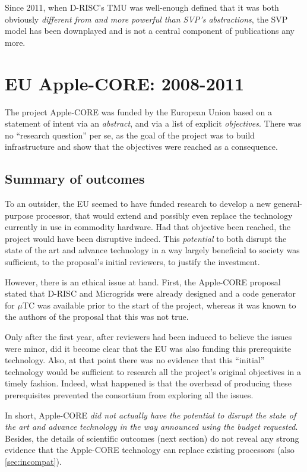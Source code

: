 Since 2011, when D-RISC's TMU was well-enough defined that it was
both obviously \emph{different from and more powerful than SVP's abstractions},
the SVP model has been downplayed and is not a central component of
publications any more.

\section{EU Apple-CORE: 2008-2011}

The project Apple-CORE was funded by the European Union based on a
statement of intent via an \emph{abstract}, and via a list of explicit 
\emph{objectives}. There was no ``research question'' per se, as
the goal of the project was to build infrastructure and show
that the objectives were reached as a consequence.

\subsection{Summary of outcomes}

To an outsider, 
the EU seemed to have funded research to develop a new general-purpose processor,
that would extend and possibly even replace the technology currently
in use in commodity hardware. Had that objective been reached, the
project would have been disruptive indeed. This \emph{potential} to
both disrupt the state of the art and advance technology in a way
largely beneficial to society was sufficient, to the proposal's
initial reviewers, to justify the investment.

However, there is an ethical issue at hand. First, the Apple-CORE
proposal stated that D-RISC and Microgrids were already
designed and a code generator for $\mu$TC was available prior
to the start of the project, whereas it was known to the authors of the proposal that
this was not true. 

Only after the first year, after reviewers had been induced to believe
the issues were minor, did it become clear that the EU was also
funding this prerequisite technology. Also, at that point there was no
evidence that this ``initial'' technology would be sufficient to
research all the project's original objectives in a timely fashion.
Indeed, what happened is that the overhead of producing these
prerequisites prevented the consortium from exploring all the issues.

In short, Apple-CORE \emph{did not actually have the potential to
  disrupt the state of the art and advance technology in the way
  announced using the budget requested}. Besides, the details of scientific
outcomes (\cf next section) do not reveal any strong evidence that the
Apple-CORE technology can replace existing processors (\cf also \cref{sec:incompat}). 


